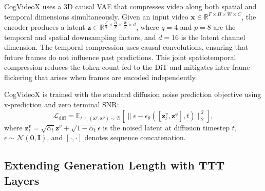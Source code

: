 \documentclass[runningheads]{llncs}
\begin{document}
CogVideoX uses a 3D causal VAE that compresses video along both spatial and temporal dimensions simultaneously. Given an input video $\mathbf{x} \in \mathbb{R}^{F \times H \times W \times C}$, the encoder produces a latent $\mathbf{z} \in \mathbb{R}^{\frac{F}{q} \times \frac{H}{p} \times \frac{W}{p} \times d}$, where $q{=}4$ and $p{=}8$ are the temporal and spatial downsampling factors, and $d{=}16$ is the latent channel dimension. The temporal compression uses causal convolutions, ensuring that future frames do not influence past predictions. This joint spatiotemporal compression reduces the token count fed to the DiT and mitigates inter-frame flickering that arises when frames are encoded independently. 

CogVideoX is trained with the standard diffusion noise prediction objective using v-prediction and zero terminal SNR:
\begin{equation}
    \mathcal{L}_{\text{diff}} = \mathbb{E}_{t, \epsilon, (\mathbf{z}^v, \mathbf{z}^\phi) \sim \mathcal{D}} \left[ \| \epsilon - \epsilon_\theta([\mathbf{z}^v_t, \mathbf{z}^\phi], t) \|_2^2 \right],
\end{equation}
where $\mathbf{z}^v_t = \sqrt{\bar{\alpha}_t}\mathbf{z}^v + \sqrt{1 - \bar{\alpha}_t}\epsilon$ is the noised latent at diffusion timestep $t$, $\epsilon \sim \mathcal{N}(\mathbf{0}, \mathbf{I})$, and $[\cdot, \cdot]$ denotes sequence concatenation.

\subsection{Extending Generation Length with TTT Layers}
\end{document}
